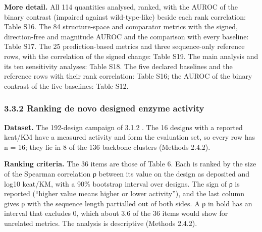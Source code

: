 \documentclass[
  10pt,
]{article}
\DeclareRobustCommand{\_}{\textunderscore\hspace{0pt}}
\begin{document}
\textbf{More
detail.} All 114
quantities analysed,
ranked, with the
AUROC of the binary
contrast (impaired
against
wild-type-like)
beside each rank
correlation: Table
S16. The 84
structure-space and
comparator metrics
with the signed,
direction-free and
magnitude AUROC and
the comparison with
every baseline:
Table S17. The 25
prediction-based
metrics and three
sequence-only
reference rows, with
the correlation of
the signed change:
Table S19. The main
analysis and its ten
sensitivity
analyses: Table S18.
The five declared
baselines and the
reference rows with
their rank
correlation: Table
S16; the AUROC of
the binary contrast
of the five
baselines: Table
S12.

\subsubsection{3.3.2
Ranking de novo
designed enzyme
activity}

\textbf{Dataset.}
The 192-design
campaign of 3.1.2
\cite{kim2026}. The
16 designs with a
reported kcat/KM
have a measured
activity and form
the evaluation set,
so every row has n =
16; they lie in 8 of
the 136 backbone
clusters (Methods
2.4.2).

\textbf{Ranking
criteria.} The 36
items are those of
Table 6. Each is
ranked by the size
of the Spearman
correlation ρ
\cite{spearman1904}
between its value on
the design as
deposited and log10
kcat/KM, with a 90\%
bootstrap interval
over designs. The
sign of ρ is
reported (``higher
value means higher
or lower
activity''), and the
last column gives ρ
with the sequence
length partialled
out of both sides. A
ρ in bold has an
interval that
excludes 0, which
about 3.6 of the 36
items would show for
unrelated metrics.
The analysis is
descriptive (Methods
2.4.2).
\end{document}
